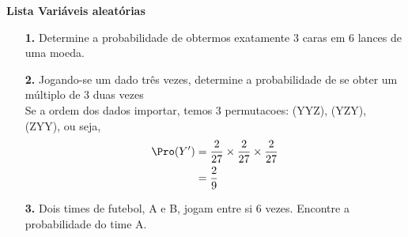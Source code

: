 \begin{center}
\textbf{\LARGE{Lista Variáveis aleatórias}}
\end{center}
\begin{itemize}
	\item[\textbf{1.}] Determine a probabilidade de obtermos exatamente 3 caras em 6 lances de uma moeda.\\
	\item[\textbf{2.}] Jogando-se um dado três vezes, determine a probabilidade de se obter um múltiplo de 3 duas vezes\\
	\ifx Se a ordem dos dados importar, temos 3 permutacoes: (YYZ), (YZY), (ZYY), ou seja,\\
	\begin{align*}
	    \Pro(Y') &= \frac{2}{27}\times\frac{2}{27}\times\frac{2}{27}\\
	    &= \frac{2}{9}
	\end{align*}
	\fi
	\item[\textbf{3.}] Dois times de futebol, A e B, jogam entre si 6 vezes. Encontre a probabilidade do time A.
\end{itemize}
